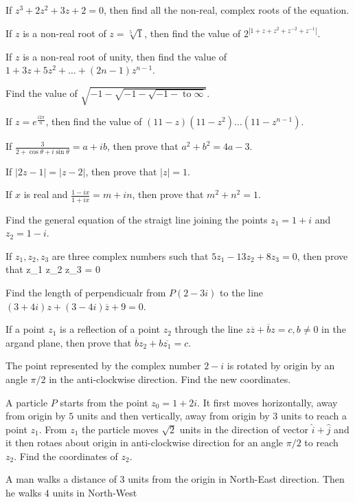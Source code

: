 \item If $z^3 + 2z^2 + 3z + 2 = 0$, then find all the non-real, complex roots of the equation.
\item If $z$ is a non-real root of $z = \sqrt[5]{1}$, then find the value of $2^{|1 + z + z^2 + z^{-2} + z^{-1}|}$.
\item If $z$ is a non-real root of unity, then find the value of $1 + 3z + 5z^2 + \ldots + (2n - 1)z^{n - 1}$.
\item Find the value of $\sqrt{-1 - \sqrt{-1 - \sqrt{-1 - \;\text{to}\; \infty}}}$.
\item If $z = e^{\frac{i2\pi}{n}}$, then find the value of $(11 - z)(11 - z^2)\ldots(11 - z^{n - 1})$.
\item If $\frac{3}{2 + \cos\theta + i\sin\theta} = a + ib$, then prove that $a^2 + b^2 = 4a - 3$.
\item If $|2z - 1| = |z - 2|$, then prove that $|z| = 1$.
\item If $x$ is real and $\frac{1 - ix}{1 + ix} = m + in$, then prove that $m^2 + n^2 = 1$.
\item Find the general equation of the straigt line joining the points $z_1 = 1 + i$ and $z_2 = 1 - i$.
\item If $z_1, z_2, z_3$ are three complex numbers such that $5z_1 - 13z_2 + 8z_3 = 0$, then prove that \startformula \startdeterminant \NC z_1 \NC
   \NR\NC z_2 \NC {} \NR\NC z_3 \NC {} \NR\stopdeterminant = 0\stopformula
\item Find the length of perpendicualr from $P(2 - 3i)$ to the line $(3 + 4i)z + (3 - 4i)\overline{z} + 9 = 0$.
\item If a point $z_1$ is a reflection of a point $z_2$ through the line $z\overline{z} + \overline{b}z = c, b\neq 0$ in the argand
  plane, then prove that $\overline{b}z_2 + b\overline{z_1} = c$.
\item The point represented by the complex number $2 - i$ is rotated by origin by an angle $\pi/2$ in the anti-clockwise
  direction. Find the new coordinates.
\item A particle $P$ starts from the point $z_0 = 1 + 2i$. It first moves horizontally, away from origin by $5$ units and then
  vertically, away from origin by $3$ units to reach a point $z_1$. From $z_1$ the particle moves $\sqrt{2}$ units in the
  direction of vector $\hat{i} + \hat{j}$ and it then rotaes about origin in anti-clockwise direction for an angle $\pi/2$
  to reach $z_2.$ Find the coordinates of $z_2$.
\item A man walks a distance of $3$ units from the origin in North-East direction. Then he walks $4$ units in North-West
